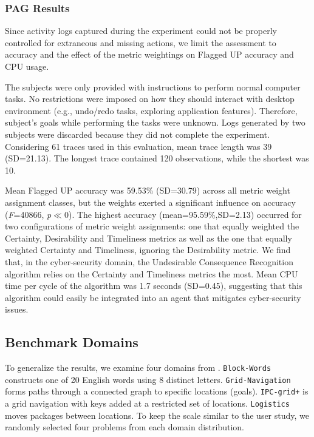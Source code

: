 \subsubsection{PAG Results}
Since activity logs captured during the experiment could not be properly controlled for extraneous and missing actions, we limit the assessment to accuracy and the effect of the metric weightings on Flagged UP accuracy and CPU usage.

The subjects were only provided with instructions to perform normal computer tasks. No restrictions were imposed on how they should interact with desktop environment (e.g., undo/redo tasks, exploring application features). Therefore, subject's goals while performing the tasks were unknown. Logs generated by two subjects were discarded because they did not complete the experiment. Considering 61 traces used in this evaluation, mean trace length was 39 (SD=21.13). The longest trace contained 120 observations, while the shortest was 10. 


Mean Flagged UP accuracy was 59.53\% (SD=30.79) across all metric weight assignment classes, but the weights exerted a significant influence on accuracy (\textit{F}=40866, \textit{p}$\ll$0). 
The highest accuracy (mean=95.59\%,SD=2.13) occurred for two configurations of metric weight assignments: one that equally weighted the Certainty, Desirability and Timeliness metrics as well as the one that equally weighted Certainty and Timeliness, ignoring the Desirability metric. 
We find that, in the cyber-security domain, the Undesirable Consequence Recognition algorithm relies on the Certainty and Timeliness metrics the most.
Mean CPU time per cycle of the algorithm was 1.7 seconds (SD=0.45), suggesting that this algorithm could easily be integrated into an agent that mitigates cyber-security issues.


\subsection{Benchmark Domains}
To generalize the results, we examine four domains from \cite{ramirez2009plan}. 
\sloppy
{\tt Block-Words} constructs one of 20 English words using 8 distinct letters. {\tt Grid-Navigation} forms paths through a connected graph to specific locations (goals). {\tt IPC-grid+} is a grid navigation with keys added at a restricted set of locations. {\tt Logistics} moves packages between locations. To keep the scale similar to the user study, we randomly selected four problems from each domain distribution.

